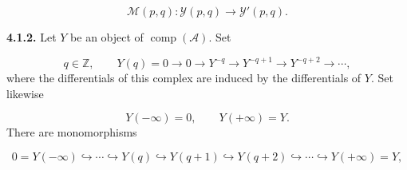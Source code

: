\begin{equation}
\mathcal M(p,q)\colon\mathcal Y(p,q)\longrightarrow\mathcal Y'(p,q).
\tag{4.1.1.9}
\end{equation}

\medskip\noindent\textbf{4.1.2.}\quad
Let $Y$ be an object of $\operatorname{comp}(\mathcal A)$. Set

\begin{equation}
q\in\mathbb Z,\qquad
Y(q)=0\longrightarrow0\longrightarrow Y^{-q}\longrightarrow
Y^{-q+1}\longrightarrow Y^{-q+2}\longrightarrow\cdots,
\tag{4.1.2.1}
\end{equation}
where the differentials of this complex are induced by the differentials of
$Y$. Set likewise

\begin{equation}
Y(-\infty)=0,\qquad Y(+\infty)=Y.
\tag{4.1.2.2}
\end{equation}
There are monomorphisms

\[
0=Y(-\infty)\hookrightarrow\cdots\hookrightarrow Y(q)
\hookrightarrow Y(q+1)\hookrightarrow Y(q+2)\hookrightarrow\cdots
\hookrightarrow Y(+\infty)=Y,
\]
\endgroup

